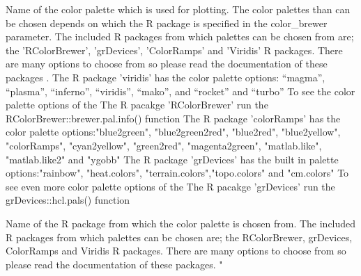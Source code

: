 \documentclass[a4paper]{book}
\begin{document}
\begin{Arguments}
\begin{ldescription}
\item[\code{palette\_name}] Name of the color palette which is used for plotting.
The color palettes than can be chosen depends on which the R package is specified in
the color\_brewer parameter. The included R packages from which palettes can be chosen
from are; the 'RColorBrewer', 'grDevices', 'ColorRamps' and 'Viridis' R packages.
There are many options to choose from so please
read the documentation of these packages .
The R package 'viridis' has the color palette options: “magma”, “plasma”,
“inferno”, “viridis”, “mako”, and “rocket”  and “turbo”
To see the color palette options of the The R pacakge 'RColorBrewer' run
the RColorBrewer::brewer.pal.info() function
The R package 'colorRamps' has the color palette options:"blue2green",
"blue2green2red", "blue2red",    "blue2yellow", "colorRamps",    "cyan2yellow",
"green2red", "magenta2green", "matlab.like", "matlab.like2" and    "ygobb"
The R package 'grDevices' has the built in  palette options:"rainbow",
"heat.colors", "terrain.colors","topo.colors" and "cm.colors"
To see even more color palette options of the The R pacakge 'grDevices' run
the grDevices::hcl.pals() function

\item[\code{color\_brewer}] Name of the R package from which the color palette is chosen from.
The included R packages from which palettes can be chosen
are; the RColorBrewer, grDevices, ColorRamps and Viridis R packages.
There are many options to choose from so please
read the documentation of these packages. "
\end{ldescription}
\end{Arguments}
%
\end{document}
